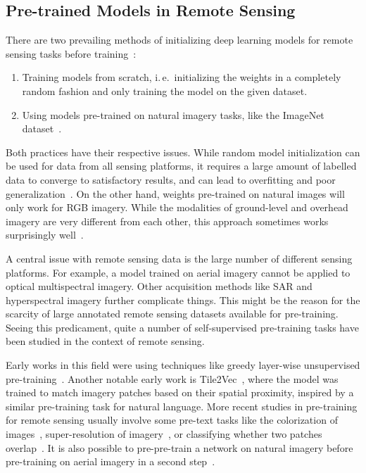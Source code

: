 \documentclass[journal]{IEEEtran}
\newcommand{\ie}{i.\,e.\ }
\begin{document}
\subsection{Pre-trained Models in Remote Sensing}
There are two prevailing methods of initializing deep learning models
for remote sensing tasks before training~\cite{zhu_deep_2017}:
\begin{enumerate}
\item Training models from scratch,
\ie initializing the weights in a completely random fashion
and only training the model on the given dataset.
\item Using models pre-trained on natural imagery tasks,
like the ImageNet dataset~\cite{imagenet}.
\end{enumerate}

Both practices have their respective issues.
While random model initialization can be used for data from all
sensing platforms, it requires a large amount of
labelled data to converge to satisfactory results,
and can lead to overfitting and poor generalization~\cite{zhu_deep_2017}.
On the other hand, weights pre-trained on natural images
will only work for RGB imagery.
While the modalities of ground-level and overhead imagery
are very different from each other,
this approach sometimes works surprisingly well~\cite{guo_crossdomain_2020}.

A central issue with remote sensing data is the large number of different
sensing platforms.
For example, a model trained on aerial imagery cannot be applied to optical multispectral imagery.
Other acquisition methods like SAR and hyperspectral imagery
further complicate things.
This might be the reason for the scarcity of
large annotated remote sensing datasets available for pre-training.
Seeing this predicament, quite a number of self-supervised pre-training tasks have
been studied in the context of remote sensing.

Early works in this field
were using techniques like
greedy layer-wise unsupervised pre-training~\cite{romero_unsupervised_2016}.
Another notable early work is Tile2Vec~\cite{tile2vec},
where the model was trained to match imagery patches
based on their spatial proximity,
inspired by a similar pre-training task for natural language.
More recent studies in pre-training for remote sensing usually involve some
pre-text tasks like the colorization of images~\cite{vincenzi_color_2021},
super-resolution of imagery~\cite{peng_pre-training_2021},
or classifying whether two patches overlap~\cite{leenstra_self-supervised_2021}.
It is also possible to pre-pre-train a network on natural imagery
before pre-training on aerial imagery in a second step~\cite{reed_self-supervised_2021}.
\end{document}
